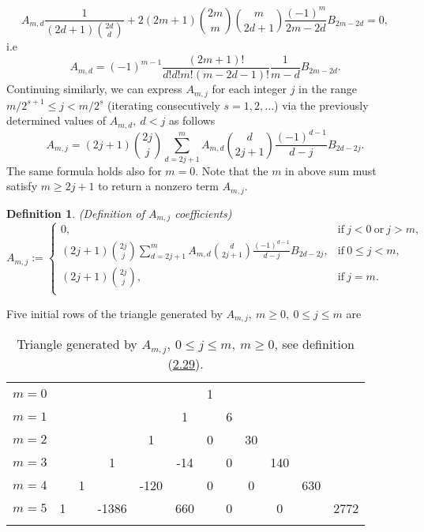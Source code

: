 \documentclass[11pt, letterpaper]{amsart}
\theoremstyle{definition}
\newtheorem{defn}[thm]{Definition}
\theoremstyle{remark}
\numberwithin{equation}{section}
\begin{document}
\begin{equation*}\label{gen_10}
A_{m,d} \frac{1}{(2d+1)\binom{2d}{d}} + 2 (2m+1) \binom{2m}{m} \binom{m}{2d+1} \frac{(-1)^m}{2m-2d} B_{2m-2d} = 0,
\end{equation*}
i.e
\begin{equation*}\label{gen_11}
A_{m,d} = (-1)^{m-1} \frac{(2m+1)!}{d!d!m!(m-2d-1)!}\frac{1}{m-d} B_{2m-2d}.
\end{equation*}
Continuing similarly, we can express $A_{m,j}$ for each integer $j$ in the range $m/2^{s+1}\leq j< m/2^s$ (iterating consecutively $s=1,2,...$) via the previously determined values of $A_{m,d}, \ d<j$ as follows
\begin{equation*}\label{gen_12}
A_{m,j} = (2j+1)\binom{2j}{j} \sum_{d=2j+1}^{m} A_{m,d} \binom{d}{2j+1} \frac{(-1)^{d-1}}{d-j} B_{2d-2j}.
\end{equation*}
The same formula holds also for $m=0$. Note that the $m$ in above sum must satisfy $m\geq2j+1$ to return a nonzero term $A_{m,j}$.
\begin{defn}\label{gen_13}
\textit{(Definition of $A_{m,j}$ coefficients)}
\begin{equation*}
A_{m,j}:=
\begin{cases}
0, & \mathrm{if } \ j<0 \ \mathrm{or } \ j>m, \\
(2j+1)\binom{2j}{j} \sum_{d=2j+1}^{m} A_{m,d} \binom{d}{2j+1} \frac{(-1)^{d-1}}{d-j} B_{2d-2j}, & \mathrm{if } \ 0 \leq j < m, \\
(2j+1)\binom{2j}{j}, & \mathrm{if } \ j=m. \\
\end{cases}
\end{equation*}
\end{defn}
Five initial rows of the triangle generated by $A_{m,j}, \ m\geq0, \ 0\leq j \leq m$ are

\begin{table}[H]
\begin{tabular}{rccccccccccc}
$m=0$&  &    &    &    &    &  1 &    &    &    &    &   \\\noalign{\smallskip\smallskip}
$m=1$&  &    &    &    &  1 &    &  6 &    &    &    &   \\\noalign{\smallskip\smallskip}
$m=2$&  &    &    &  1 &    &  0 &    &  30 &    &    &   \\\noalign{\smallskip\smallskip}
$m=3$&  &    &  1 &    &  -14 &    &  0 &    &  140 &    &   \\\noalign{\smallskip\smallskip}
$m=4$&  &  1 &    &  -120 &    &  0 &    &  0 &    &  630 &   \\\noalign{\smallskip\smallskip}
$m=5$&1 &    &  -1386 &    & 660 &    & 0 &    &  0 &    & 2772 \\\noalign{\smallskip\smallskip}
\end{tabular}
\caption{Triangle generated by $A_{m,j}, \ 0\leq j \leq m, \ m\geq0$, see definition (\hyperref[gen_13]{2.29}).} \label{fig_4}
\end{table}
\end{document}
